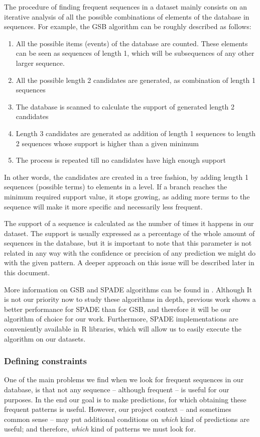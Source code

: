 The procedure of finding frequent sequences in a dataset mainly consists on an iterative analysis of all the possible combinations of elements of the database in sequences. For example, the GSB algorithm can be roughly described as follows:

\begin{enumerate}
\item All the possible items (events) of the database are counted. These elements can be seen as sequences of length 1, which will be subsequences of any other larger sequence.
\item All the possible length 2 candidates are generated, as combination of length 1 sequences
\item The database is scanned to calculate the support of generated length 2 candidates
\item Length 3 candidates are generated as addition of length 1 sequences to length 2 sequences whose support is higher than a given minimum
\item The process is repeated till no candidates have high enough support
\end{enumerate}

In other words, the candidates are created in a tree fashion, by adding length 1 sequences (possible terms) to elements in a level. If a branch reaches the minimum required support value, it stops growing, as adding more terms to the sequence will make it more specific and necessarily less frequent.

The support of a sequence is calculated as the number of times it happens in our dataset. The support is usually expressed as a percentage of the whole amount of sequences in the database, but it is important to note that this parameter is not related in any way with the confidence or precision of any prediction we might do with the given pattern. A deeper approach on this issue will be described later in this document.

More information on GSB and SPADE algorithms can be found in \cite{zaki2001spade, zhao2003sequential, srikant1996mining}. Although It is not our priority now to study these algorithms in depth, previous work shows a better performance for SPADE than for GSB, and therefore it will be our algorithm of choice for our work. Furthermore, SPADE implementations are conveniently available in R\cite{ihaka1996r} libraries, which will allow us to easily execute the algorithm on our datasets.

\subsubsection{Defining constraints}
One of the main problems we find when we look for frequent sequences in our database, is that not any sequence -- although frequent -- is useful for our purposes. In the end our goal is to make predictions, for which obtaining these frequent patterns is useful. However, our project context -- and sometimes common sense -- may put additional conditions on \emph{which} kind of predictions are useful; and therefore, \emph{which} kind of patterns we must look for.

